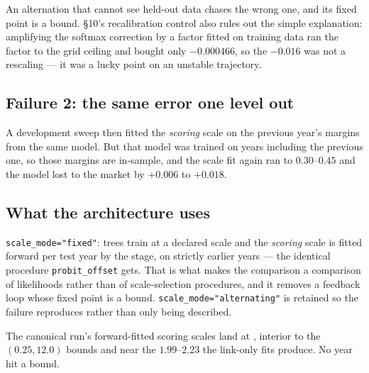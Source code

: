 An alternation that cannot see held-out data chases the wrong one, and its fixed point is a
bound. §10's recalibration control also rules out the simple explanation: amplifying the softmax
correction by a factor fitted on training data ran the factor to the grid ceiling and bought
only $-0.000466$, so the $-0.016$ was not a rescaling --- it was a lucky point on an unstable
trajectory.

\subsection*{Failure 2: the same error one level out}

A development sweep then fitted the \emph{scoring} scale on the previous year's margins from the
same model. But that model was trained on years including the previous one, so those margins are
in-sample, and the scale fit again ran to $0.30$--$0.45$ and the model lost to the market by
$+0.006$ to $+0.018$.

\subsection*{What the architecture uses}

\texttt{scale\_mode="fixed"}: trees train at a declared scale and the \emph{scoring} scale is
fitted forward per test year by the stage, on strictly earlier years --- the identical procedure
\texttt{probit\_offset} gets. That is what makes the comparison a comparison of likelihoods
rather than of scale-selection procedures, and it removes a feedback loop whose fixed point is a
bound. \texttt{scale\_mode="alternating"} is retained so the failure reproduces rather than only
being described.

The canonical run's forward-fitted scoring scales land at , interior to the
$(0.25, 12.0)$ bounds and near the $1.99$--$2.23$ the link-only fits produce. No year hit a
bound.
